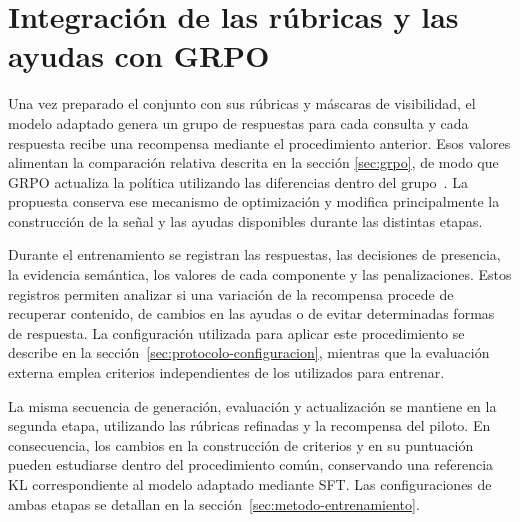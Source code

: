 \section{Integración de las rúbricas y las ayudas con GRPO}
\label{sec:metodo-integracion}
Una vez preparado el conjunto con sus rúbricas y máscaras de visibilidad, el modelo adaptado genera un grupo de respuestas para cada consulta y cada respuesta recibe una recompensa mediante el procedimiento anterior. Esos valores alimentan la comparación relativa descrita en la sección \ref{sec:grpo}, de modo que GRPO actualiza la política utilizando las diferencias dentro del grupo~\cite{shao2024deepseekmath}. La propuesta conserva ese mecanismo de optimización y modifica principalmente la construcción de la señal y las ayudas disponibles durante las distintas etapas.

Durante el entrenamiento se registran las respuestas, las decisiones de presencia, la evidencia semántica, los valores de cada componente y las penalizaciones. Estos registros permiten analizar si una variación de la recompensa procede de recuperar contenido, de cambios en las ayudas o de evitar determinadas formas de respuesta. La configuración utilizada para aplicar este procedimiento se describe en la sección~\ref{sec:protocolo-configuracion}, mientras que la evaluación externa emplea criterios independientes de los utilizados para entrenar.


La misma secuencia de generación, evaluación y actualización se mantiene en la segunda etapa, utilizando las rúbricas refinadas y la recompensa del piloto. En consecuencia, los cambios en la construcción de criterios y en su puntuación pueden estudiarse dentro del procedimiento común, conservando una referencia KL correspondiente al modelo adaptado mediante SFT. Las configuraciones de ambas etapas se detallan en la sección~\ref{sec:metodo-entrenamiento}.
